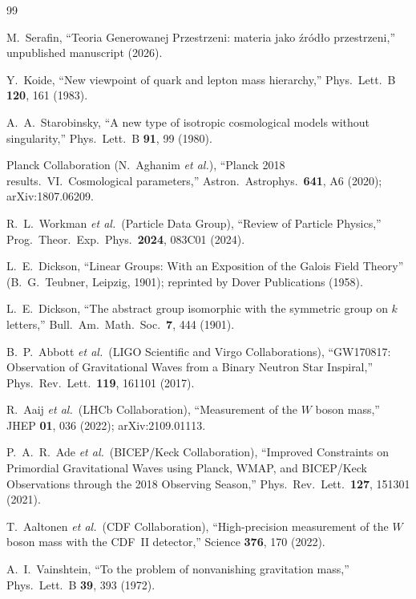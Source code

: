 \documentclass[aps,prd,twocolumn,superscriptaddress,showpacs,
  nofootinbib,floatfix,longbibliography]{revtex4-2}
\begin{document}
\begin{thebibliography}{99}

  M.~Serafin,
  ``Teoria Generowanej Przestrzeni: materia jako \'zr\'od\l{}o
  przestrzeni,''
  unpublished manuscript (2026).

  Y.~Koide,
  ``New viewpoint of quark and lepton mass hierarchy,''
  Phys.\ Lett.\ B \textbf{120}, 161 (1983).

  A.~A.~Starobinsky,
  ``A new type of isotropic cosmological models without singularity,''
  Phys.\ Lett.\ B \textbf{91}, 99 (1980).

  Planck Collaboration (N.~Aghanim \textit{et al.}),
  ``Planck 2018 results.\ VI.\ Cosmological parameters,''
  Astron.\ Astrophys.\ \textbf{641}, A6 (2020);
  arXiv:1807.06209.

  R.~L.~Workman \textit{et al.}\ (Particle Data Group),
  ``Review of Particle Physics,''
  Prog.\ Theor.\ Exp.\ Phys.\ \textbf{2024}, 083C01 (2024).

  L.~E.~Dickson,
  ``Linear Groups: With an Exposition of the Galois Field Theory''
  (B.~G.~Teubner, Leipzig, 1901);
  reprinted by Dover Publications (1958).

  L.~E.~Dickson,
  ``The abstract group isomorphic with the symmetric group on $k$ letters,''
  Bull.\ Am.\ Math.\ Soc.\ \textbf{7}, 444 (1901).

  B.~P.~Abbott \textit{et al.}\ (LIGO Scientific and Virgo Collaborations),
  ``GW170817: Observation of Gravitational Waves from a Binary
  Neutron Star Inspiral,''
  Phys.\ Rev.\ Lett.\ \textbf{119}, 161101 (2017).

  R.~Aaij \textit{et al.}\ (LHCb Collaboration),
  ``Measurement of the $W$ boson mass,''
  JHEP \textbf{01}, 036 (2022);
  arXiv:2109.01113.

  P.~A.~R.~Ade \textit{et al.}\ (BICEP/Keck Collaboration),
  ``Improved Constraints on Primordial Gravitational Waves
  using Planck, WMAP, and BICEP/Keck Observations through the
  2018 Observing Season,''
  Phys.\ Rev.\ Lett.\ \textbf{127}, 151301 (2021).

  T.~Aaltonen \textit{et al.}\ (CDF Collaboration),
  ``High-precision measurement of the $W$ boson mass with the CDF~II
  detector,''
  Science \textbf{376}, 170 (2022).

  A.~I.~Vainshtein,
  ``To the problem of nonvanishing gravitation mass,''
  Phys.\ Lett.\ B \textbf{39}, 393 (1972).

\end{thebibliography}
\end{document}
